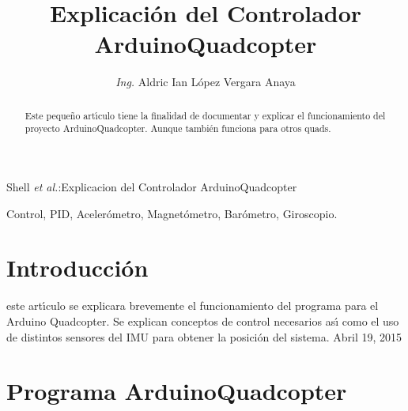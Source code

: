 \documentclass[journal]{IEEEtran}
\begin{document}
\title{Explicaci\'on del Controlador ArduinoQuadcopter}
\author{\textit{Ing.} Aldric Ian L\'opez Vergara Anaya }

%
{Shell \MakeLowercase{\textit{et al.}}:Explicacion del Controlador ArduinoQuadcopter}

\maketitle

\begin{abstract}
Este peque\~no art{\'\i}culo tiene la finalidad de documentar y explicar el funcionamiento del proyecto ArduinoQuadcopter. Aunque tambi\'en funciona para otros quads.
\end{abstract}

\begin{IEEEkeywords}
Control, PID, Aceler\'ometro, Magnet\'ometro, Bar\'ometro, Giroscopio.
\end{IEEEkeywords}

\section{Introducci\'on}
 este art{\'\i}culo se explicara brevemente el funcionamiento del programa para el Arduino Quadcopter. Se explican conceptos de control necesarios as{\'\i} como el uso de distintos sensores del IMU para obtener la posici\'on del sistema. 
\hfill Abril 19, 2015

\section{Programa ArduinoQuadcopter}

\end{document}

